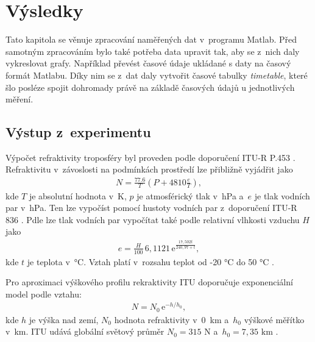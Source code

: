 \documentclass[twoside]{ctuthesis}
\newcommand{\mt}[1]{\text{#1}}
\theoremstyle{plain}
\theoremstyle{definition}
\theoremstyle{note}
\begin{document}
\chapter{Výsledky}
	Tato kapitola se věnuje zpracování naměřených dat v~programu Matlab. Před samotným zpracováním bylo také potřeba data upravit tak, aby se z~nich daly vykreslovat grafy. Například převést časové údaje ukládané s daty na časový formát Matlabu. Díky nim se z~dat daly vytvořit časové tabulky \textit{timetable}, které šlo posléze spojit dohromady právě na základě časových údajů u jednotlivých měření. 

	\section{Výstup z~experimentu}


	Výpočet refraktivity troposféry byl proveden podle doporučení ITU-R P.453 \cite{ITU:refrac}. Refraktivitu v~závoslosti na podmínkách prostředí lze přibližně vyjádřit jako
	\begin{align}
		N = \frac{77.6}{T} \left(P + 4810\frac{e}{T}\right),
		\label{eq:refr:meas}
	\end{align}
	kde $T$ je absolutní hodnota v~K, $p$ je atmosférický tlak v~hPa a~$e$ je tlak vodních par v~hPa. Ten lze vypočíst pomocí hustoty vodních par z~doporučení ITU-R 836 \cite{ITU:vapour}. Pdle \cite{ITU:refrac} lze tlak vodních par vypočítat také podle relativní vlhkosti vzduchu $H$ jako
	\begin{align}
		e = \frac{H}{100}\,6{,}1121\,\mt{e}^{\frac{17{,}502t}{240{,}97 + t}},
	\end{align}
	kde $t$ je teplota v~°C. Vztah platí v~rozsahu teplot od -20 °C do 50 °C \cite{zaklady:sireni:vln}.

	Pro aproximaci výškového profilu rekraktivity ITU doporučuje \cite{ITU:refrac} exponenciální model podle vztahu:
	\begin{align}
		N = N_\mt{0}\,\mt{e}^{-h/h_\mt{0}},
		\label{eq:refr:approx}
	\end{align}
	kde $h$ je výška nad zemí, $N_\mt{0}$ hodnota refraktivity v~0~km a~$h_\mt{0}$ výškové měřítko v~km. ITU udává globální světový průměr $N_\mt{0} = 315 \mt{ N}$ a~$h_\text{0} = 7{,}35 \mt{ km}$ \cite{zaklady:sireni:vln}.
\end{document}
